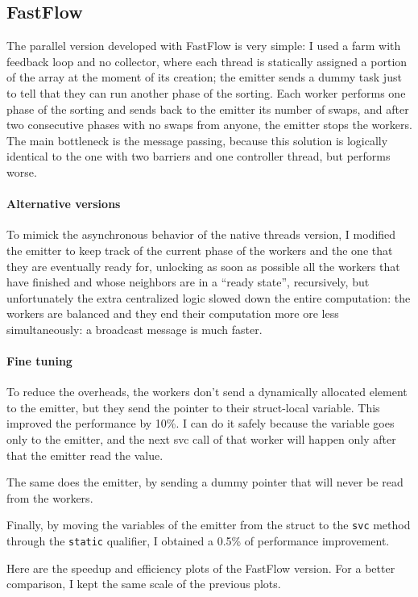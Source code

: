 \subsection{FastFlow}
The parallel version developed with FastFlow is very simple: I used a farm with feedback loop and no collector, where each thread is statically assigned a portion of the array at the moment of its creation; the emitter sends a dummy task just to tell that they can run another phase of the sorting. Each worker performs one phase of the sorting and sends back to the emitter its number of swaps, and after two consecutive phases with no swaps from anyone, the emitter stops the workers. The main bottleneck is the message passing, because this solution is logically identical to the one with two barriers and one controller thread, but performs worse.

\paragraph{Alternative versions}
To mimick the asynchronous behavior of the native threads version, I modified the emitter to keep track of the current phase of the workers and the one that they are eventually ready for, unlocking as soon as possible all the workers that have finished and whose neighbors are in a ``ready state'', recursively, but unfortunately the extra centralized logic slowed down the entire computation: the workers are balanced and they end their computation more ore less simultaneously: a broadcast message is much faster.

\paragraph{Fine tuning}
To reduce the overheads, the workers don't send a dynamically allocated element to the emitter, but they send the pointer to their struct-local variable. This improved the performance by 10\%. I can do it safely because the variable goes only to the emitter, and the next svc call of that worker will happen only after that the emitter read the value.

The same does the emitter, by sending a dummy pointer that will never be read from the workers.

Finally, by moving the variables of the emitter from the struct to the \texttt{svc} method through the \texttt{static} qualifier, I obtained a 0.5\% of performance improvement.
\bigbreak

Here are the speedup and efficiency plots of the FastFlow version. For a better comparison, I kept the same scale of the previous plots.

